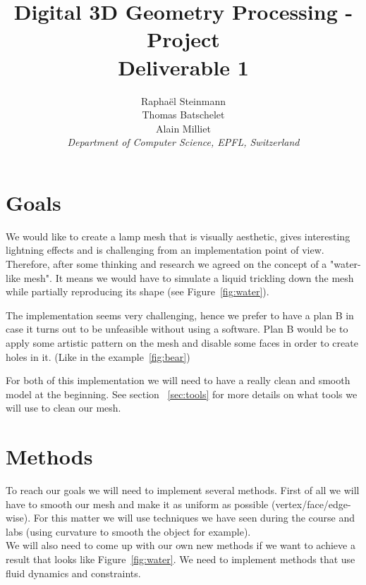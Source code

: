 \documentclass[10pt,conference,compsocconf]{IEEEtran}
\begin{document}
\title{Digital 3D Geometry Processing - Project\\
Deliverable 1}

\author{
  Rapha\"{e}l Steinmann\\
	Thomas Batschelet\\
	Alain Milliet\\
  \textit{Department of Computer Science, EPFL, Switzerland}
}

\maketitle


\section{Goals}
\label{sec:goals}
We would like to create a lamp mesh that is visually aesthetic, gives interesting lightning effects and is challenging from an implementation point of view. Therefore, after some thinking and research we agreed on the concept of a "water-like mesh". It means we would have to simulate a liquid trickling down the mesh while partially reproducing its shape (see Figure~\ref{fig:water}).

The implementation seems very challenging, hence we prefer to have a plan B in case it turns out to be unfeasible without using a software. Plan B would be to apply some artistic pattern on the mesh and disable some faces in order to create holes in it. (Like in the example~\ref{fig:bear})

For both of this implementation we will need to have a really clean and smooth model at the beginning. See section ~\ref{sec:tools} for more details on what tools we will use to clean our mesh.


\section{Methods}
\label{sec:methods}
To reach our goals we will need to implement several methods. First of all we will have to smooth our mesh and make it as uniform as possible (vertex/face/edge-wise). For this matter we will use techniques we have seen during the course and labs (using curvature to smooth the object for example).\\
We will also need to come up with our own new methods if we want to achieve a result that looks like Figure~\ref{fig:water}. We need to implement methods that use fluid dynamics and constraints.
\end{document}
